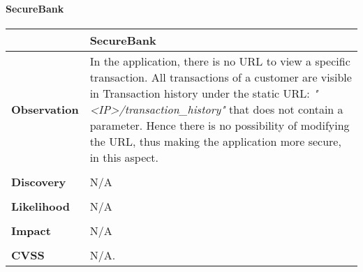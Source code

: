 \paragraph{SecureBank} \mbox{}
\begin{longtable*}{p{.20\textwidth} | p{.80\textwidth}}
    \hline
    & \textbf{SecureBank} \\
    \hline
    \textbf{Observation} &
       In the application, there is no URL to view a specific transaction. All transactions of a customer are visible in Transaction history under the static URL:
       \textit{"<IP>/transaction\_history"} that does not contain a parameter. Hence there is no possibility of modifying the URL, thus making the application more secure, in this aspect.
    \\\\
    \textbf{Discovery} &
   		N/A
    \\\\
    \textbf{Likelihood} &
	   N/A
    \\\\
    \textbf{Impact} &
  		N/A
    \\\\
    \textbf{CVSS} &
       N/A.
    \\
    \hline
\end{longtable*}
\clearpage